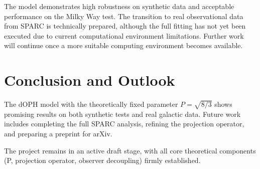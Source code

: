 \documentclass[11pt,a4paper]{article}
\begin{document}
The model demonstrates high robustness on synthetic data and acceptable performance on the Milky Way test. 
The transition to real observational data from SPARC is technically prepared, although the full fitting has not yet been executed due to current computational environment limitations. 
Further work will continue once a more suitable computing environment becomes available.

\section{Conclusion and Outlook}

The dOPH model with the theoretically fixed parameter $P = \sqrt{8/3}$ shows promising results on both synthetic tests and real galactic data. 
Future work includes completing the full SPARC analysis, refining the projection operator, and preparing a preprint for arXiv.

The project remains in an active draft stage, with all core theoretical components (P, projection operator, observer decoupling) firmly established.
\end{document}
